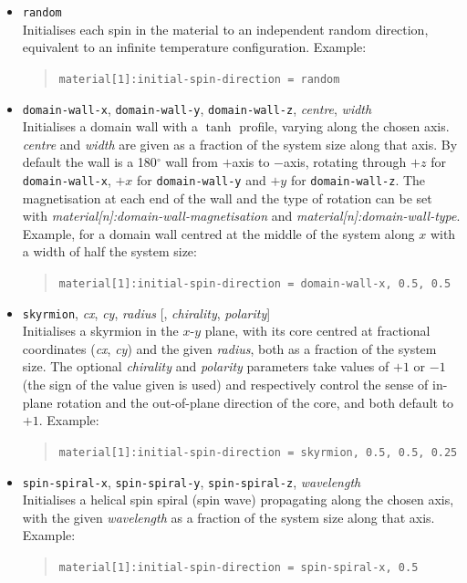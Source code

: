 \begin{itemize}

\item \verb|random| \\
Initialises each spin in the material to an independent random direction, equivalent to an infinite temperature configuration. Example:
\begin{quote}
\verb|material[1]:initial-spin-direction = random|
\end{quote}

\item \verb|domain-wall-x|, \verb|domain-wall-y|, \verb|domain-wall-z|, \emph{centre}, \emph{width} \\
Initialises a domain wall with a $\tanh$ profile, varying along the chosen axis. \emph{centre} and \emph{width} are given as a fraction of the system size along that axis. By default the wall is a 180$^\circ$ wall from $+$axis to $-$axis, rotating through $+z$ for \verb|domain-wall-x|, $+x$ for \verb|domain-wall-y| and $+y$ for \verb|domain-wall-z|. The magnetisation at each end of the wall and the type of rotation can be set with \textit{material[n]:domain-wall-magnetisation} and \textit{material[n]:domain-wall-type}. Example, for a domain wall centred at the middle of the system along $x$ with a width of half the system size:
\begin{quote}
\verb|material[1]:initial-spin-direction = domain-wall-x, 0.5, 0.5|
\end{quote}

\item \verb|skyrmion|, \emph{cx}, \emph{cy}, \emph{radius} [, \emph{chirality}, \emph{polarity}] \\
Initialises a skyrmion in the $x$-$y$ plane, with its core centred at fractional coordinates (\emph{cx}, \emph{cy}) and the given \emph{radius}, both as a fraction of the system size. The optional \emph{chirality} and \emph{polarity} parameters take values of $+1$ or $-1$ (the sign of the value given is used) and respectively control the sense of in-plane rotation and the out-of-plane direction of the core, and both default to $+1$. Example:
\begin{quote}
\verb|material[1]:initial-spin-direction = skyrmion, 0.5, 0.5, 0.25|
\end{quote}

\item \verb|spin-spiral-x|, \verb|spin-spiral-y|, \verb|spin-spiral-z|, \emph{wavelength} \\
Initialises a helical spin spiral (spin wave) propagating along the chosen axis, with the given \emph{wavelength} as a fraction of the system size along that axis. Example:
\begin{quote}
\verb|material[1]:initial-spin-direction = spin-spiral-x, 0.5|
\end{quote}


\end{itemize}
